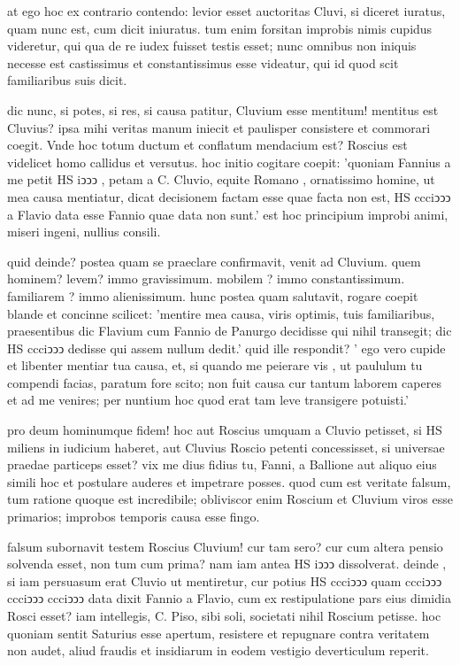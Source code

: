  at ego hoc ex contrario contendo: levior esset auctoritas Cluvi, si diceret iuratus, quam nunc est, cum dicit iniuratus. tum enim forsitan improbis nimis cupidus videretur, qui qua de re iudex fuisset testis esset; nunc omnibus non iniquis necesse est castissimus et constantissimus esse videatur, qui id quod scit familiaribus suis dicit.

 dic nunc, si potes, si res, si causa patitur, Cluvium esse mentitum! mentitus est Cluvius? ipsa mihi veritas manum iniecit et paulisper consistere et commorari coegit. Vnde hoc totum ductum et conflatum mendacium est? Roscius est videlicet homo callidus et versutus. hoc initio cogitare coepit: 'quoniam Fannius a me petit HS iↄↄↄ , petam a C. Cluvio, equite Romano , ornatissimo homine, ut mea causa mentiatur, dicat decisionem factam esse quae facta non est, HS ccciↄↄↄ a Flavio data esse Fannio quae data non sunt.' est hoc principium improbi animi, miseri ingeni, nullius consili.

 quid deinde? postea quam se praeclare confirmavit, venit ad Cluvium. quem hominem? levem? immo gravissimum. mobilem ? immo constantissimum. familiarem ? immo alienissimum. hunc postea quam salutavit, rogare coepit blande et concinne scilicet: 'mentire mea causa, viris optimis, tuis familiaribus, praesentibus dic Flavium cum Fannio de Panurgo decidisse qui nihil transegit; dic HS ccciↄↄↄ dedisse qui assem nullum dedit.' quid ille respondit? ' ego vero cupide et libenter mentiar tua causa, et, si quando me peierare vis , ut paululum tu compendi facias, paratum fore scito; non fuit causa cur tantum laborem caperes et ad me venires; per nuntium hoc quod erat tam leve transigere potuisti.'

 pro deum hominumque fidem! hoc aut Roscius umquam a Cluvio petisset, si HS miliens in iudicium haberet, aut Cluvius Roscio petenti concessisset, si universae praedae particeps esset? vix me dius fidius tu, Fanni, a Ballione aut aliquo eius simili hoc et postulare auderes et impetrare posses. quod cum est veritate falsum, tum ratione quoque est incredibile; obliviscor enim Roscium et Cluvium viros esse primarios; improbos temporis causa esse fingo.

 falsum subornavit testem Roscius Cluvium! cur tam sero? cur cum altera pensio solvenda esset, non tum cum prima? nam iam antea HS iↄↄↄ dissolverat. deinde , si iam persuasum erat Cluvio ut mentiretur, cur potius HS ccciↄↄↄ quam ccciↄↄↄ ccciↄↄↄ ccciↄↄↄ data dixit Fannio a Flavio, cum ex restipulatione pars eius dimidia Rosci esset? iam intellegis, C. Piso, sibi soli, societati nihil Roscium petisse. hoc quoniam sentit Saturius esse apertum, resistere et repugnare contra veritatem non audet, aliud fraudis et insidiarum in eodem vestigio deverticulum reperit.

